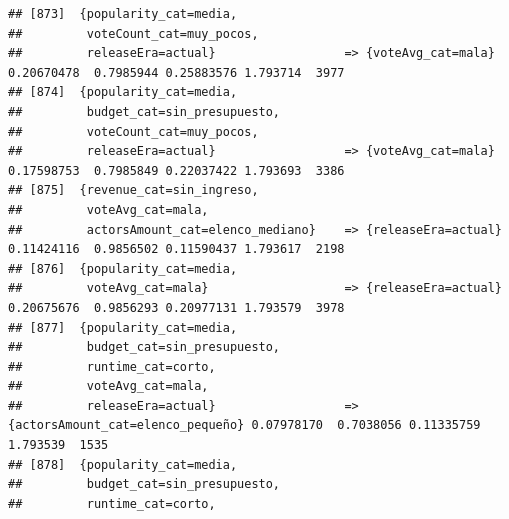 \documentclass[
]{article}
\begin{document}
\begin{verbatim}
## [873]  {popularity_cat=media,                                                                                                   
##         voteCount_cat=muy_pocos,                                                                                                
##         releaseEra=actual}                  => {voteAvg_cat=mala}                0.20670478  0.7985944 0.25883576 1.793714  3977
## [874]  {popularity_cat=media,                                                                                                   
##         budget_cat=sin_presupuesto,                                                                                             
##         voteCount_cat=muy_pocos,                                                                                                
##         releaseEra=actual}                  => {voteAvg_cat=mala}                0.17598753  0.7985849 0.22037422 1.793693  3386
## [875]  {revenue_cat=sin_ingreso,                                                                                                
##         voteAvg_cat=mala,                                                                                                       
##         actorsAmount_cat=elenco_mediano}    => {releaseEra=actual}               0.11424116  0.9856502 0.11590437 1.793617  2198
## [876]  {popularity_cat=media,                                                                                                   
##         voteAvg_cat=mala}                   => {releaseEra=actual}               0.20675676  0.9856293 0.20977131 1.793579  3978
## [877]  {popularity_cat=media,                                                                                                   
##         budget_cat=sin_presupuesto,                                                                                             
##         runtime_cat=corto,                                                                                                      
##         voteAvg_cat=mala,                                                                                                       
##         releaseEra=actual}                  => {actorsAmount_cat=elenco_pequeño} 0.07978170  0.7038056 0.11335759 1.793539  1535
## [878]  {popularity_cat=media,                                                                                                   
##         budget_cat=sin_presupuesto,                                                                                             
##         runtime_cat=corto,                                                                                                      

\end{verbatim}
\end{document}

